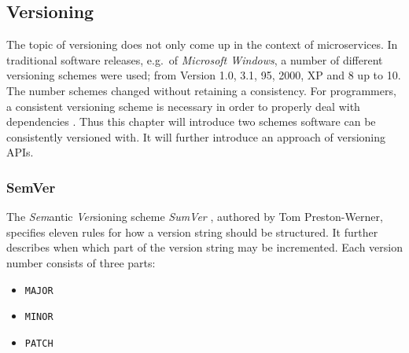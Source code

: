 
\subsection{Versioning}%
\label{sub:Versioning}
The topic of versioning does not only come up in the context of microservices.
In traditional software releases, e.g.\ of \textit{Microsoft Windows}, a number
of different versioning schemes were used; from Version 1.0, 3.1, 95, 2000, XP
and 8 up to 10. The number schemes changed without retaining a consistency. For
programmers, a consistent versioning scheme is necessary in order to properly
deal with dependencies \autocite{Preston-WernerSemanticVersioning2.0.0}. Thus
this chapter will introduce two schemes software can be consistently versioned
with. It will further introduce an approach of versioning \acp{API}.

\subsubsection{SemVer}%
\label{ssub:SemVer}
The \textit{Sem}antic \textit{Ver}sioning scheme \textit{SumVer}
\autocite{Preston-WernerSemanticVersioning2.0.0}, authored by Tom
Preston-Werner, specifies eleven rules for how a version string should be
structured. It further describes when which part of the version string may be
incremented. Each version number consists of three parts:

\begin{itemize}
  \item \texttt{MAJOR}
  \item \texttt{MINOR}
  \item \texttt{PATCH} 
\end{itemize}

